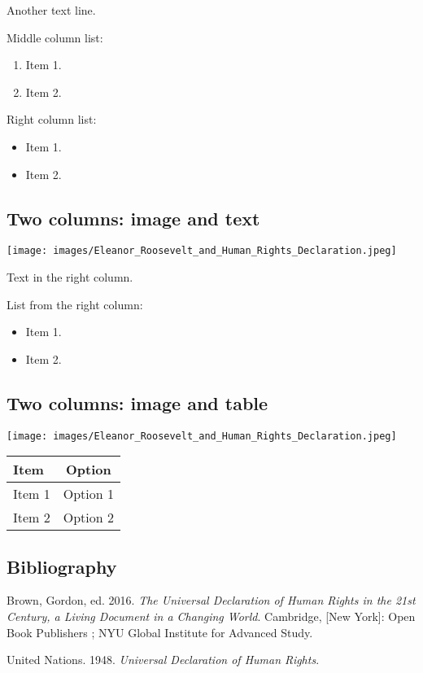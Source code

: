 \documentclass[
]{beamer}
\providecommand{\tightlist}{%
  \setlength{\itemsep}{0pt}\setlength{\parskip}{0pt}}
\newlength{\cslhangindent}
\newenvironment{CSLReferences}[2] %
 {\begin{list}{}{%
  \setlength{\itemindent}{0pt}
  \setlength{\leftmargin}{0pt}
  \setlength{\parsep}{0pt}
  \ifodd #1
   \setlength{\leftmargin}{\cslhangindent}
   \setlength{\itemindent}{-1\cslhangindent}
  \fi
  \setlength{\itemsep}{#2\baselineskip}}}
 {\end{list}}
\begin{document}
Another text line.

Middle column list:

\begin{enumerate}
\def\labelenumi{\arabic{enumi}.}
\tightlist
\item
  Item 1.
\item
  Item 2.
\end{enumerate}

Right column list:

\begin{itemize}
\tightlist
\item
  Item 1.
\item
  Item 2.
\end{itemize}

\subsection{Two columns: image and
text}\label{two-columns-image-and-text}

\texttt{[image: images/Eleanor\_Roosevelt\_and\_Human\_Rights\_Declaration.jpeg]}

Text in the right column.

List from the right column:

\begin{itemize}
\tightlist
\item
  Item 1.
\item
  Item 2.
\end{itemize}

\subsection{Two columns: image and
table}\label{two-columns-image-and-table}

\texttt{[image: images/Eleanor\_Roosevelt\_and\_Human\_Rights\_Declaration.jpeg]}

\begin{longtable}[]{@{}lc@{}}
\toprule\noalign{}
\textbf{Item} & \textbf{Option} \\
\midrule\noalign{}
\endhead
\bottomrule\noalign{}
\endlastfoot
Item 1 & Option 1 \\
Item 2 & Option 2 \\
\end{longtable}

\subsection{Bibliography}\label{bibliography}

\label{refs}
\begin{CSLReferences}{1}{0}
Brown, Gordon, ed. 2016. \emph{The {Universal} {Declaration} of {Human}
{Rights} in the 21st Century, a Living Document in a Changing World}.
Cambridge, {[}New York{]}: Open Book Publishers ; NYU Global Institute
for Advanced Study.

United Nations. 1948. \emph{Universal Declaration of Human Rights}.

\end{CSLReferences}
\end{document}
